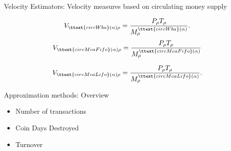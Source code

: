 \documentclass[]{beamer}
\begin{document}
\begin{frame}{Velocity Estimators: Velocity measures based on circulating money supply}

  \begin{align*}
    V_{\ttext{circWba}(\alpha) \rho} = \frac{P_{\rho}T_{\rho}}{M_{\rho}^{\ttext{circWba}(\alpha)}}.
  \end{align*}
  \begin{align*}
    V_{\ttext{circMcaFifo}(\alpha) \rho} = \frac{P_{\rho}T_{\rho}}{M_{\rho}^{\ttext{circMcaFifo}(\alpha)}}
  \end{align*}

  \begin{align*}
    V_{\ttext{circMcaLifo}(\alpha) \rho} = \frac{P_{\rho}T_{\rho}}{M_{\rho}^{\ttext{circMcaLifo}(\alpha)}}.
  \end{align*}

  
\end{frame}


\begin{frame}{Approximation methods: Overview}
  
  \begin{itemize}
  \item Number of transactions \linebreak[1]
  \item Coin Days Destroyed \linebreak[1]
  \item Turnover \linebreak[1]
  \end{itemize}
  
\end{frame}

\end{document}

